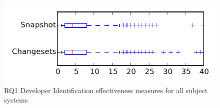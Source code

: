 
\begin{figure}
\centering
\includegraphics[height=0.4\textheight]{figures/dit/rq1_tiny}
\caption{RQ1 Developer Identification effectiveness measures for all subject systems}
\label{fig:dit:rq1:tiny}
\end{figure}
